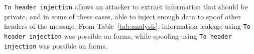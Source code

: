 \lstinline{To header injection} allows an attacker to extract information that should be private,
and in some of these cases, able to inject enough data to spoof other headers of the \email message. From Table~\ref{tab:analysis}, information leakage using \lstinline{To header injection} was possible on \ehito forms, while spoofing using \lstinline{To header injection} was possible on \ehitoxcheck forms.
    
    
